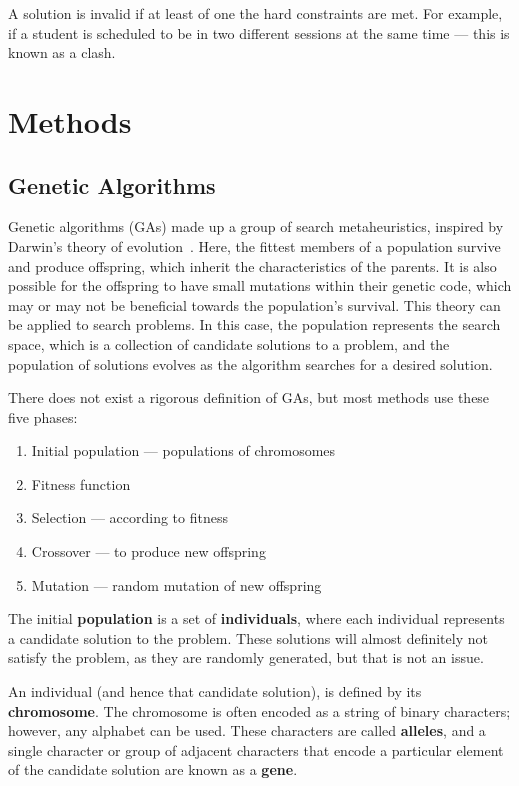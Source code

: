 \documentclass[a4paper, 12pt]{report}
\begin{document}
A solution is invalid if at least of one the hard constraints are met.
For example, if a student is scheduled to be in two different sessions at the
same time --- this is known as a clash.

\section{Methods}

\subsection{Genetic Algorithms}

Genetic algorithms (GAs) made up a group of search metaheuristics, inspired by
Darwin's theory of evolution~\cite{ga_book}.
Here, the fittest members of a population survive and produce offspring, which
inherit the characteristics of the parents.
It is also possible for the offspring to have small mutations within their
genetic code, which may or may not be beneficial towards the population's
survival.
This theory can be applied to search problems.
In this case, the population represents the search space, which is a collection 
of candidate solutions to a problem, and the population of solutions evolves as
the algorithm searches for a desired solution.

There does not exist a rigorous definition of GAs, but most methods use these
five phases:

\begin{enumerate}
	\item Initial population --- populations of chromosomes
	\item Fitness function
	\item Selection --- according to fitness
	\item Crossover --- to produce new offspring
	\item Mutation --- random mutation of new offspring
\end{enumerate}

The initial \textbf{population} is a set of \textbf{individuals}, where each
individual represents a candidate solution to the problem.
These solutions will almost definitely not satisfy the problem, as they are
randomly generated, but that is not an issue.

An individual (and hence that candidate solution), is defined by its
\textbf{chromosome}.
The chromosome is often encoded as a string of binary characters; however, any
alphabet can be used.
These characters are called \textbf{alleles}, and a single character or group of
adjacent characters that encode a particular element of the candidate solution
are known as a \textbf{gene}.
\end{document}
